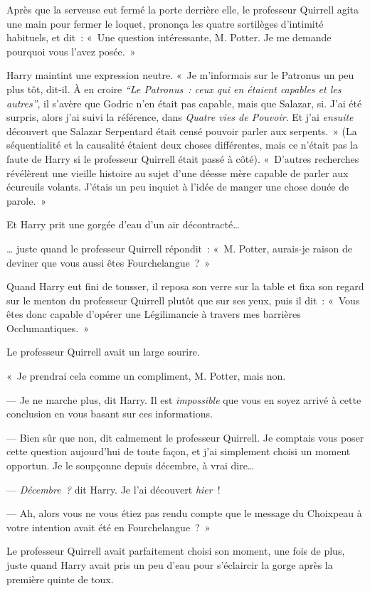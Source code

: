 Après que la serveuse eut fermé la porte derrière elle, le professeur Quirrell agita une main pour fermer le loquet, prononça les quatre sortilèges d'intimité habituels, et dit~: «~Une question intéressante, M. Potter. Je me demande pourquoi vous l'avez posée.~»

Harry maintint une expression neutre. «~Je m'informais sur le Patronus un peu plus tôt, dit-il. À en croire \emph{“Le Patronus~: ceux qui en étaient capables et les autres”}, il s'avère que Godric n'en était pas capable, mais que Salazar, si. J'ai été surpris, alors j'ai suivi la référence, dans \emph{Quatre vies de Pouvoir}. Et j'ai \emph{ensuite} découvert que Salazar Serpentard était censé pouvoir parler aux serpents.~» (La séquentialité et la causalité étaient deux choses différentes, mais ce n'était pas la faute de Harry si le professeur Quirrell était passé à côté). «~D'autres recherches révélèrent une vieille histoire au sujet d'une déesse mère capable de parler aux écureuils volants. J'étais un peu inquiet à l'idée de manger une chose douée de parole.~»

Et Harry prit une gorgée d'eau d'un air décontracté…

… juste quand le professeur Quirrell répondit~: «~M. Potter, aurais-je raison de deviner que vous aussi êtes Fourchelangue~?~»

Quand Harry eut fini de tousser, il reposa son verre sur la table et fixa son regard sur le menton du professeur Quirrell plutôt que sur ses yeux, puis il dit~: «~Vous êtes donc capable d'opérer une Légilimancie à travers mes barrières Occlumantiques.~»

Le professeur Quirrell avait un large sourire.

«~Je prendrai cela comme un compliment, M. Potter, mais non.

--- Je ne marche plus, dit Harry. Il est \emph{impossible} que vous en soyez arrivé à cette conclusion en vous basant sur ces informations.

--- Bien sûr que non, dit calmement le professeur Quirrell. Je comptais vous poser cette question aujourd'hui de toute façon, et j'ai simplement choisi un moment opportun. Je le soupçonne depuis décembre, à vrai dire…

--- \emph{Décembre~?} dit Harry. Je l'ai découvert \emph{hier}~!

--- Ah, alors vous ne vous étiez pas rendu compte que le message du Choixpeau à votre intention avait été en Fourchelangue~?~»

Le professeur Quirrell avait parfaitement choisi son moment, une fois de plus, juste quand Harry avait pris un peu d'eau pour s'éclaircir la gorge après la première quinte de toux.

